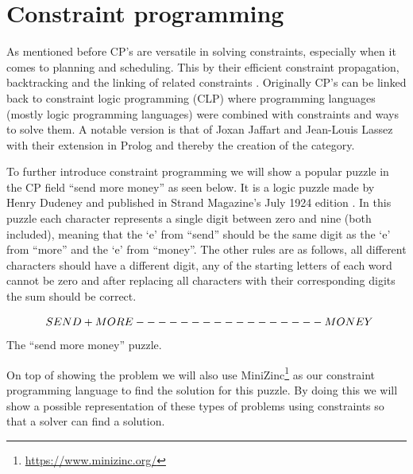 \section{Constraint programming}
\label{CS:CP}
As mentioned before CP’s are versatile in solving constraints, especially when it comes to planning and scheduling. This by their efficient constraint propagation, backtracking and the linking of related constraints \cite{66WikiCP}. Originally CP’s can be linked back to constraint logic programming (CLP) where programming languages (mostly logic programming languages) were combined with constraints and ways to solve them. A notable version is that of Joxan Jaffart and Jean-Louis Lassez \cite{65jaffar1987constraint, 66WikiCP} with their extension in Prolog and thereby the creation of the category.

To further introduce constraint programming we will show a popular puzzle in the CP field “send more money” as seen below. It is a logic puzzle made by Henry Dudeney and published in Strand Magazine’s July 1924 edition \cite{sendMoreMoney}.
In this puzzle each character represents a single digit between zero and nine (both included), meaning that the ‘e’ from “send” should be the same digit as the ‘e’ from “more” and the ‘e’ from “money”. The other rules are as follows, all different characters should have a different digit, any of the starting letters of each word cannot be zero and after replacing all characters with their corresponding digits the sum should be correct. 
\begin{center}
\label{prettySendMoreMoneyTXT}
	\[$$
	\; \; S E N D\\
	+ M O R E\\
	-----------------\\
	M O N E Y
	$$\] The “send more money” puzzle.
\end{center}

On top of showing the problem we will also use MiniZinc\footnote{\url{https://www.minizinc.org/}} as our constraint programming language to find the solution for this puzzle. By doing this we will show a possible representation of these types of problems using constraints so that a solver can find a solution.

